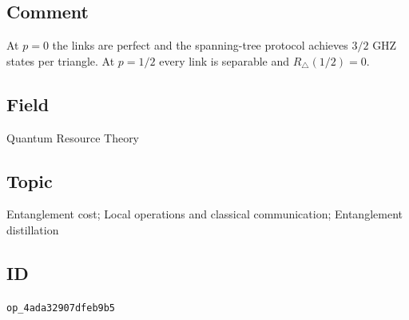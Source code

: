\subsection*{Comment}

At $p=0$ the links are perfect and the spanning-tree protocol achieves $3/2$ GHZ states per triangle. At $p=1/2$ every link is separable and $R_\triangle(1/2)=0$.

\subsection*{Field}

Quantum Resource Theory

\subsection*{Topic}

Entanglement cost; Local operations and classical communication; Entanglement distillation

\subsection*{ID}

\texttt{op\_4ada32907dfeb9b5}
